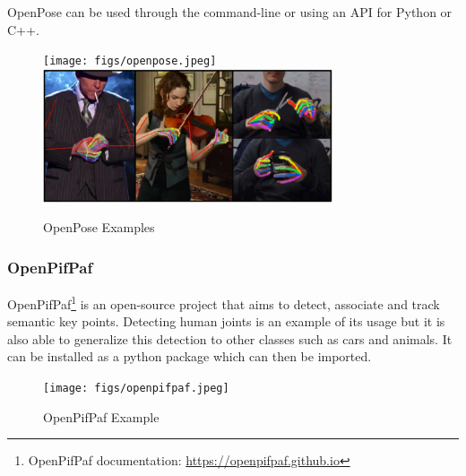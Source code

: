 OpenPose can be used through the command-line or using an API for Python or C++.

\begin{figure}[h]
\centerline{\texttt{[image: figs/openpose.jpeg]}\includegraphics[height=1.55in]{figs/openpose2.PNG}}
\caption[OpenPose Examples]{OpenPose Examples \cite{Cao2021,Simon2017}}
\label{openpose}
\end{figure}

\subsubsection{OpenPifPaf}

OpenPifPaf\cite{Kreiss2021,Kreiss2019}\footnote{OpenPifPaf documentation: \url{https://openpifpaf.github.io}} is an open-source project that aims to detect, associate and track semantic key points. Detecting human joints is an example of its usage but it is also able to generalize this detection to other classes such as cars and animals. It can be installed as a python package which can then be imported.

\begin{figure}[h]
\centerline{\texttt{[image: figs/openpifpaf.jpeg]}}
\caption[OpenPifPaf Example]{OpenPifPaf Example \cite{Kreiss2021}}
\label{openpifpaf}
\end{figure}